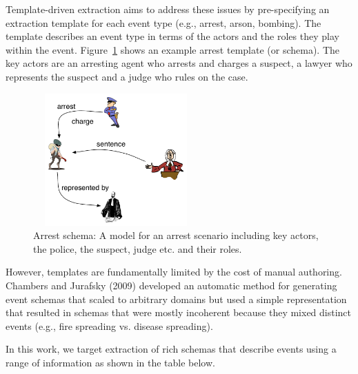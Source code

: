 Template-driven extraction aims to address these issues by pre-specifying an extraction template for each event type (e.g., arrest, arson, bombing). The template describes an event type in terms of the actors and the roles they play within the event. Figure~\ref{fig:arrest} shows an example arrest template (or schema).  The key actors are an arresting agent who arrests and charges a suspect, a lawyer who represents the suspect and a judge who rules on the case. 
\begin{figure}
	\vspace{-2ex}
	\begin{center}
	\includegraphics[width=2.5in,height=2in]{figures/arrest-scenario} 	
	\vspace{-2ex}
	\caption{\label{fig:arrest} {\small Arrest schema: A model for an arrest scenario including key actors, the police, the suspect, judge etc. and their roles.}}
	\end{center}
\end{figure}
However, templates are fundamentally limited by the cost of manual authoring. Chambers and Jurafsky (2009) developed an automatic method for generating event schemas that scaled to arbitrary domains but used a simple representation that resulted in schemas that were mostly incoherent because they mixed distinct events (e.g., fire spreading vs. disease spreading). 

In this work, we target extraction of rich schemas that describe events using a range of information as shown in the table below.

